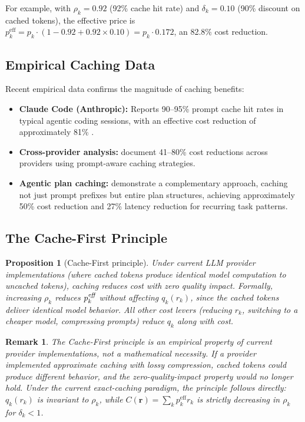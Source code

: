 \documentclass[11pt, a4paper, logo, copyright]{googledeepmind}
\newtheorem{proposition}{Proposition}[section]
\newtheorem*{remark}{Remark}
\begin{document}
For example, with $\rho_k = 0.92$ (92\% cache hit rate) and $\delta_k = 0.10$ (90\% discount on cached tokens), the effective price is $p_k^{\text{eff}} = p_k \cdot (1 - 0.92 + 0.92 \times 0.10) = p_k \cdot 0.172$, an 82.8\% cost reduction.

\subsection{Empirical Caching Data}

Recent empirical data confirms the magnitude of caching benefits:
\begin{itemize}[nosep]
    \item \textbf{Claude Code (Anthropic):} Reports 90--95\% prompt cache hit rates in typical agentic coding sessions, with an effective cost reduction of approximately 81\% \citep{anthropic2026coding}.
    \item \textbf{Cross-provider analysis:} \citet{liang2026cache} document 41--80\% cost reductions across providers using prompt-aware caching strategies.
    \item \textbf{Agentic plan caching:} \citet{zhang2025plancache} demonstrate a complementary approach, caching not just prompt prefixes but entire plan structures, achieving approximately 50\% cost reduction and 27\% latency reduction for recurring task patterns.
\end{itemize}

\subsection{The Cache-First Principle}

\begin{proposition}[Cache-First principle]\label{thm:cache-first}
Under current LLM provider implementations (where cached tokens produce identical model computation to uncached tokens), caching reduces cost with zero quality impact. Formally, increasing $\rho_k$ reduces $p_k^{\emph{eff}}$ without affecting $q_k(r_k)$, since the cached tokens deliver identical model behavior. All other cost levers (reducing $r_k$, switching to a cheaper model, compressing prompts) reduce $q_k$ along with cost.
\end{proposition}

\begin{remark}
The Cache-First principle is an empirical property of current provider implementations, not a mathematical necessity. If a provider implemented approximate caching with lossy compression, cached tokens could produce different behavior, and the zero-quality-impact property would no longer hold. Under the current exact-caching paradigm, the principle follows directly: $q_k(r_k)$ is invariant to $\rho_k$, while $C(\mathbf{r}) = \sum_k p_k^{\text{eff}} r_k$ is strictly decreasing in $\rho_k$ for $\delta_k < 1$.
\end{remark}
\end{document}

